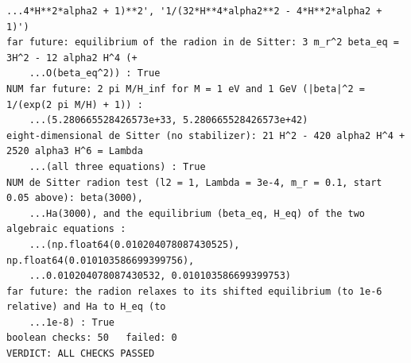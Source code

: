 \documentclass[10pt,a4paper]{article}
\begin{document}
\begin{Verbatim}[fontsize=\small,frame=single,framesep=2mm]
    ...4*H**2*alpha2 + 1)**2', '1/(32*H**4*alpha2**2 - 4*H**2*alpha2 + 1)')
far future: equilibrium of the radion in de Sitter: 3 m_r^2 beta_eq = 3H^2 - 12 alpha2 H^4 (+
    ...O(beta_eq^2)) : True
NUM far future: 2 pi M/H_inf for M = 1 eV and 1 GeV (|beta|^2 = 1/(exp(2 pi M/H) + 1)) :
    ...(5.280665528426573e+33, 5.280665528426573e+42)
eight-dimensional de Sitter (no stabilizer): 21 H^2 - 420 alpha2 H^4 + 2520 alpha3 H^6 = Lambda
    ...(all three equations) : True
NUM de Sitter radion test (l2 = 1, Lambda = 3e-4, m_r = 0.1, start 0.05 above): beta(3000),
    ...Ha(3000), and the equilibrium (beta_eq, H_eq) of the two algebraic equations :
    ...(np.float64(0.010204078087430525), np.float64(0.010103586699399756),
    ...0.010204078087430532, 0.010103586699399753)
far future: the radion relaxes to its shifted equilibrium (to 1e-6 relative) and Ha to H_eq (to
    ...1e-8) : True
boolean checks: 50   failed: 0
VERDICT: ALL CHECKS PASSED
\end{Verbatim}
\end{document}
